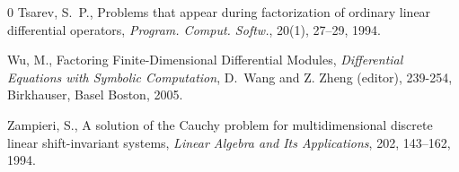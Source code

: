 \begin{thebibliography}{0}
Tsarev, S.~P., Problems that appear during factorization of
ordinary linear differential operators, {\em Program. Comput.
Softw.}, 20(1), 27--29, 1994.





Wu, M., Factoring Finite-Dimensional Differential Modules, {\em
Differential Equations with Symbolic Computation}, D.~Wang and Z.
Zheng (editor), 239-254, Birkhauser, Basel Boston, 2005.


Zampieri, S., A solution of the {C}auchy problem for
multidimensional discrete linear shift-invariant systems,
 {\em Linear Algebra and Its Applications},
 202, 143--162, 1994.









\end{thebibliography}
